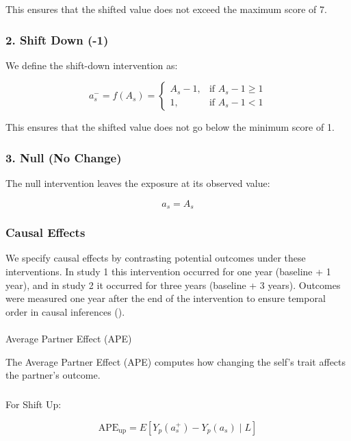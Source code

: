 \documentclass[
  single column]{article}
\makeatletter
\let\oldparagraph\paragraph
\renewcommand{\paragraph}{
    \@ifstar
      \xxxParagraphStar
      \xxxParagraphNoStar
  }
\newcommand{\xxxParagraphStar}[1]{\oldparagraph*{#1}\mbox{}}
\newcommand{\xxxParagraphNoStar}[1]{\oldparagraph{#1}\mbox{}}
\let\oldsubparagraph\subparagraph
\renewcommand{\subparagraph}{
    \@ifstar
      \xxxSubParagraphStar
      \xxxSubParagraphNoStar
  }
\newcommand{\xxxSubParagraphStar}[1]{\oldsubparagraph*{#1}\mbox{}}
\newcommand{\xxxSubParagraphNoStar}[1]{\oldsubparagraph{#1}\mbox{}}
\makeatother
\begin{document}
This ensures that the shifted value does not exceed the maximum score of
7.

\subsubsection{2. Shift Down (-1)}\label{shift-down--1}

We define the shift-down intervention as:

\[
a_s^- = f(A_s) = 
\begin{cases}
A_s - 1, & \text{if } A_s - 1 \geq 1 \\
1, & \text{if } A_s - 1 < 1
\end{cases}
\]

This ensures that the shifted value does not go below the minimum score
of 1.

\subsubsection{3. Null (No Change)}\label{null-no-change}

The null intervention leaves the exposure at its observed value:

\[
a_s = A_s
\]

\subsubsection{Causal Effects}\label{causal-effects}

We specify causal effects by contrasting potential outcomes under these
interventions. In study 1 this intervention occurred for one year
(baseline + 1 year), and in study 2 it occurred for three years
(baseline + 3 years). Outcomes were measured one year after the end of
the intervention to ensure temporal order in causal inferences
().

\paragraph{Average Partner Effect
(APE)}\label{average-partner-effect-ape}

The Average Partner Effect (APE) computes how changing the self's trait
affects the partner's outcome.

\subparagraph{For Shift Up:}\label{for-shift-up}

\[
\text{APE}_{\text{up}} = E\left[ Y_p(a_s^+) - Y_p(a_s) \mid L \right]
\]
\end{document}
